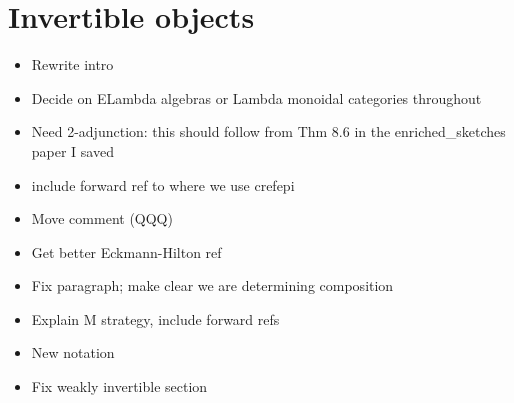 \documentclass{amsart}
\begin{document}
\section{ Invertible objects}
\begin{itemize}
\item Rewrite intro
\item Decide on ELambda algebras or Lambda monoidal categories throughout
\item Need 2-adjunction: this should follow from Thm 8.6 in the enriched\_sketches paper I saved
\item include forward ref to where we use cref{epi}



\item Move comment (QQQ)
\item Get better Eckmann-Hilton ref



\item Fix paragraph; make clear we are determining composition
\item Explain M strategy, include forward refs



\item New notation

\item Fix weakly invertible section
\end{itemize}
\end{document}
